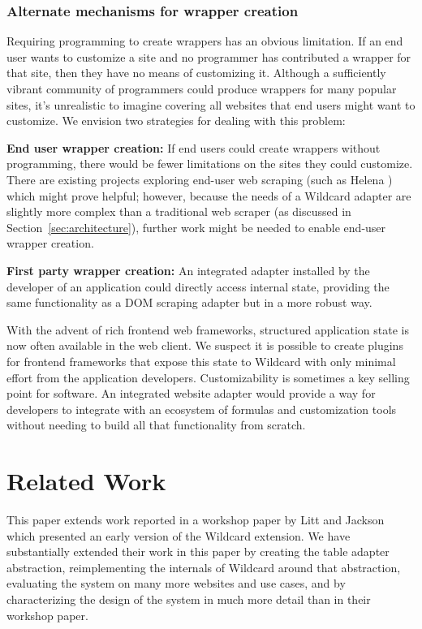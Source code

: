 \documentclass[sigplan,screen,10pt,anonymous,review]{acmart}
\begin{document}
\hypertarget{alternate-mechanisms-for-wrapper-creation}{%
\subsubsection{Alternate mechanisms for wrapper
creation}\label{alternate-mechanisms-for-wrapper-creation}}

Requiring programming to create wrappers has an obvious limitation. If
an end user wants to customize a site and no programmer has contributed
a wrapper for that site, then they have no means of customizing it.
Although a sufficiently vibrant community of programmers could produce
wrappers for many popular sites, it's unrealistic to imagine covering
all websites that end users might want to customize. We envision two
strategies for dealing with this problem:

\textbf{End user wrapper creation:} If end users could create wrappers
without programming, there would be fewer limitations on the sites they
could customize. There are existing projects exploring end-user web
scraping (such as Helena \citep{chasins2018}) which might prove helpful;
however, because the needs of a Wildcard adapter are slightly more
complex than a traditional web scraper (as discussed in
Section~\ref{sec:architecture}), further work might be needed to enable
end-user wrapper creation.

\textbf{First party wrapper creation:} An integrated adapter installed
by the developer of an application could directly access internal state,
providing the same functionality as a DOM scraping adapter but in a more
robust way.

With the advent of rich frontend web frameworks, structured application
state is now often available in the web client. We suspect it is
possible to create plugins for frontend frameworks that expose this
state to Wildcard with only minimal effort from the application
developers. Customizability is sometimes a key selling point for
software. An integrated website adapter would provide a way for
developers to integrate with an ecosystem of formulas and customization
tools without needing to build all that functionality from scratch.

\hypertarget{sec:related-work}{%
\section{Related Work}\label{sec:related-work}}

This paper extends work reported in a workshop paper by Litt and Jackson
\citep{litt2020} which presented an early version of the Wildcard
extension. We have substantially extended their work in this paper by
creating the table adapter abstraction, reimplementing the internals of
Wildcard around that abstraction, evaluating the system on many more
websites and use cases, and by characterizing the design of the system
in much more detail than in their workshop paper.
\end{document}
